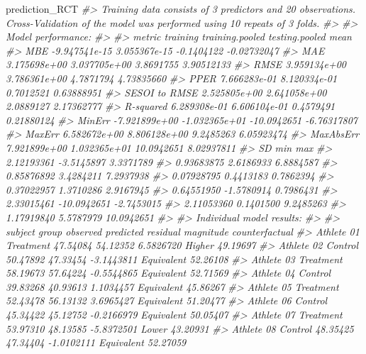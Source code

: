\documentclass[
]{book}
\newenvironment{Shaded}{\begin{snugshade}}{\end{snugshade}}
\newcommand{\CommentTok}[1]{\textcolor[rgb]{0.56,0.35,0.01}{\textit{#1}}}
\newcommand{\NormalTok}[1]{#1}
\begin{document}
\begin{Shaded}
\begin{Highlighting}[]
\NormalTok{prediction\_RCT}
\CommentTok{\#> Training data consists of 3 predictors and 20 observations. Cross{-}Validation of the model was performed using 10 repeats of 3 folds.}
\CommentTok{\#> }
\CommentTok{\#> Model performance:}
\CommentTok{\#> }
\CommentTok{\#>         metric      training training.pooled testing.pooled        mean}
\CommentTok{\#>            MBE {-}9.947541e{-}15    3.055367e{-}15     {-}0.1404122 {-}0.02732047}
\CommentTok{\#>            MAE  3.175698e+00    3.037705e+00      3.8691755  3.90512133}
\CommentTok{\#>           RMSE  3.959134e+00    3.786361e+00      4.7871794  4.73835660}
\CommentTok{\#>           PPER  7.666283e{-}01    8.120334e{-}01      0.7012521  0.63888951}
\CommentTok{\#>  SESOI to RMSE  2.525805e+00    2.641058e+00      2.0889127  2.17362777}
\CommentTok{\#>      R{-}squared  6.289308e{-}01    6.606104e{-}01      0.4579491  0.21880124}
\CommentTok{\#>         MinErr {-}7.921899e+00   {-}1.032365e+01    {-}10.0942651 {-}6.76317807}
\CommentTok{\#>         MaxErr  6.582672e+00    8.806128e+00      9.2485263  6.05923474}
\CommentTok{\#>      MaxAbsErr  7.921899e+00    1.032365e+01     10.0942651  8.02937811}
\CommentTok{\#>          SD         min        max}
\CommentTok{\#>  2.12193361  {-}3.5145897  3.3371789}
\CommentTok{\#>  0.93683875   2.6186933  6.8884587}
\CommentTok{\#>  0.85876892   3.4284211  7.2937938}
\CommentTok{\#>  0.07928795   0.4413183  0.7862394}
\CommentTok{\#>  0.37022957   1.3710286  2.9167945}
\CommentTok{\#>  0.64551950  {-}1.5780914  0.7986431}
\CommentTok{\#>  2.33015461 {-}10.0942651 {-}2.7453015}
\CommentTok{\#>  2.11053360   0.1401500  9.2485263}
\CommentTok{\#>  1.17919840   5.5787979 10.0942651}
\CommentTok{\#> }
\CommentTok{\#> Individual model results:}
\CommentTok{\#> }
\CommentTok{\#>     subject     group observed predicted   residual  magnitude counterfactual}
\CommentTok{\#>  Athlete 01 Treatment 47.54084  54.12352  6.5826720     Higher       49.19697}
\CommentTok{\#>  Athlete 02   Control 50.47892  47.33454 {-}3.1443811 Equivalent       52.26108}
\CommentTok{\#>  Athlete 03 Treatment 58.19673  57.64224 {-}0.5544865 Equivalent       52.71569}
\CommentTok{\#>  Athlete 04   Control 39.83268  40.93613  1.1034457 Equivalent       45.86267}
\CommentTok{\#>  Athlete 05 Treatment 52.43478  56.13132  3.6965427 Equivalent       51.20477}
\CommentTok{\#>  Athlete 06   Control 45.34422  45.12752 {-}0.2166979 Equivalent       50.05407}
\CommentTok{\#>  Athlete 07 Treatment 53.97310  48.13585 {-}5.8372501      Lower       43.20931}
\CommentTok{\#>  Athlete 08   Control 48.35425  47.34404 {-}1.0102111 Equivalent       52.27059}

\end{Highlighting}
\end{Shaded}
\end{document}
